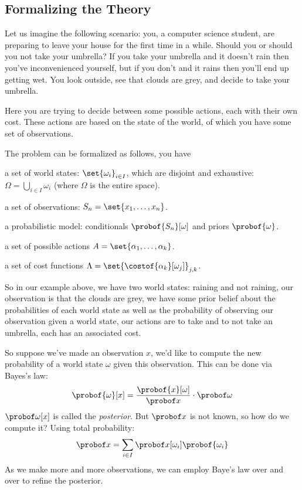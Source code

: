 \subsection{Formalizing the Theory}

Let us imagine the following scenario: you, a computer science student, are preparing to leave your house for the first time in a while.
Should you or should you not take your umbrella?
If you take your umbrella and it doesn't rain then you've inconvenienced yourself, but if you don't and it rains then you'll end up getting wet.
You look outside, see that clouds are grey, and decide to take your umbrella.

Here you are trying to decide between some possible actions, each with their own cost.
These actions are based on the state of the world, of which you have some set of observations.

The problem can be formalized as follows, you have
\benum
    \item a set of world states: $\set{\omega_i}_{i\in I}$, which are disjoint and exhaustive: $\Omega=\bigcup_{i\in I}\omega_i$ (where $\Omega$ is the entire space).
    \item a set of observations: $S_n=\set{x_1,\dots,x_n}$.
    \item a probabilistic model: conditionals $\probof{S_n}[\omega]$ and priors $\probof{\omega}$.
    \item a set of possible actions $A=\set{\alpha_1,\dots,\alpha_k}$.
    \item a set of cost functions $\Lambda=\set{\costof{\alpha_k}[\omega_j]}_{j,k}$.
\eenum

So in our example above, we have two world states: raining and not raining, our observation is that the clouds are grey, we have some prior belief about the probabilities of each world state as well as
the probability of observing our observation given a world state, our actions are to take and to not take an umbrella, each has an associated cost.

So suppose we've made an observation $x$, we'd like to compute the new probability of a world state $\omega$ given this observation.
This can be done via Bayes's law:
$$ \probof{\omega}[x] = \frac{\probof{x}[\omega]}{\probof x}\cdot\probof\omega $$
$\probof\omega[x]$ is called the {\it posterior}.
But $\probof x$ is not known, so how do we compute it?
Using total probability:
$$ \probof x = \sum_{i\in I}\probof x[\omega_i]\probof{\omega_i} $$
As we make more and more observations, we can employ Baye's law over and over to refine the posterior.

